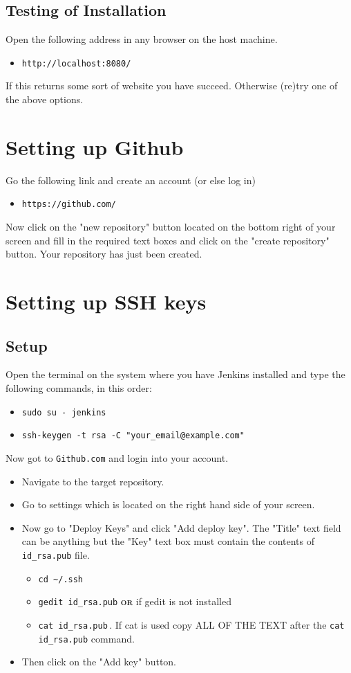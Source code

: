 \documentclass{article}
\begin{document}
\subsection{Testing of Installation}
Open the following address in any browser on the host machine.
\begin{itemize}
\item{\verb#http://localhost:8080/#}
\end{itemize}
If this returns some sort of website you have succeed. Otherwise (re)try one of the above options.

\section{Setting up Github}
Go the following link and create an account (or else log in)
\begin{itemize}
\item{\verb#https://github.com/#}
\end{itemize}
Now click on the "new repository" button located on the bottom right of your screen and fill in the required text boxes and click on the "create repository" button. Your repository has just been created.

\section{Setting up SSH keys}

\subsection{Setup}
Open the terminal on the system where you have Jenkins installed and type the following commands, in this order:
\begin{itemize}
\item \verb#sudo su - jenkins#
\item \verb#ssh-keygen -t rsa -C "your_email@example.com"#
\end{itemize}

Now got to \verb#Github.com# and login into your account. 
\begin{itemize}
\item{Navigate to the target repository.}
\item{Go to settings which is located on the right hand side of your screen.}
\item{Now go to "Deploy Keys" and click "Add deploy key". The "Title" text field can be anything but the "Key" text box must contain the contents of \verb#id_rsa.pub# file.}
    \begin{itemize} 
    The contents can befound by typing the following commands in the terminal.
    \item{\verb#cd ~/.ssh#}
    \item{\verb#gedit id_rsa.pub# \textsc{\textbf{or}} if gedit is not installed}
    \item{\verb#cat id_rsa.pub#$\,$. If cat is used copy ALL OF THE TEXT after the \verb#cat id_rsa.pub# command.}
    \end{itemize}
\item{Then click on the "Add key" button.}
\end{itemize}
\end{document}
